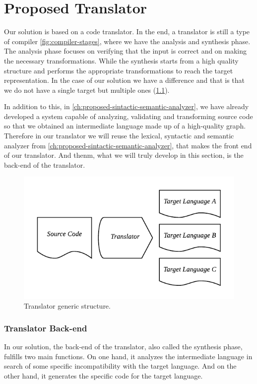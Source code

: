 \chapter{Proposed Translator}
\label{ch:proposed-system}

Our solution is based on a code translator. In the end, a translator is still a type of compiler \cref{fig:compiler-stages},
where we have the analysis and synthesis phase. The analysis phase focuses on verifying that the input is correct and on
making the necessary transformations. While the synthesis starts from a high quality structure and performs the
appropriate transformations to reach the target representation. In the case of our solution we have a difference
and that is that we do not have a single target but multiple ones (\cref{fig:translator}).

In addition to this, in \cref{ch:proposed-sintactic-semantic-analyzer}, we have already developed a system capable of analyzing,
validating and transforming source code so that we obtained an intermediate language made up of a
high-quality graph. Therefore in our translator we will reuse the lexical, syntactic and semantic
analyzer from \cref{ch:proposed-sintactic-semantic-analyzer}, that makes the front end of our translator.
And thenm, what we will truly develop in this section, is the back-end of the translator.

\begin{figure}
    \includegraphics{images/translator.pdf}
    \centering
	\caption[Translator generic structure]{Translator generic structure.}
    \label{fig:translator}
\end{figure}

\subsection{Translator Back-end}
In our solution, the back-end of the translator, also called the synthesis phase,
fulfills two main functions. On one hand, it analyzes the intermediate language
in search of some specific incompatibility with the target language. And on the
other hand, it generates the specific code for the target language.


